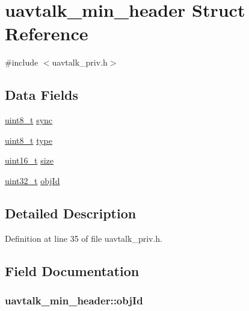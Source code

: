 \hypertarget{structuavtalk__min__header}{\section{uavtalk\-\_\-min\-\_\-header Struct Reference}
\label{structuavtalk__min__header}
}


{\ttfamily \#include $<$uavtalk\-\_\-priv.\-h$>$}

\subsection*{Data Fields}
\begin{DoxyCompactItemize}
\item 
\hyperlink{stdint_8h_aba7bc1797add20fe3efdf37ced1182c5}{uint8\-\_\-t} \hyperlink{structuavtalk__min__header_a1f264cf34649646db13e6ce6dbf93ef8}{sync}
\item 
\hyperlink{stdint_8h_aba7bc1797add20fe3efdf37ced1182c5}{uint8\-\_\-t} \hyperlink{structuavtalk__min__header_a50b5dda063861e09e6275d4cc108bcd8}{type}
\item 
\hyperlink{stdint_8h_a273cf69d639a59973b6019625df33e30}{uint16\-\_\-t} \hyperlink{structuavtalk__min__header_a7f75bcff0b29fb58f7ca4640b5be8eb6}{size}
\item 
\hyperlink{stdint_8h_a435d1572bf3f880d55459d9805097f62}{uint32\-\_\-t} \hyperlink{structuavtalk__min__header_a53f2edd4203be08998ea0fbfb09bf7cf}{obj\-Id}
\end{DoxyCompactItemize}


\subsection{Detailed Description}


Definition at line 35 of file uavtalk\-\_\-priv.\-h.



\subsection{Field Documentation}
\hypertarget{structuavtalk__min__header_a53f2edd4203be08998ea0fbfb09bf7cf}{
\subsubsection[{obj\-Id}]{ uavtalk\-\_\-min\-\_\-header\-::obj\-Id}}\label{structuavtalk__min__header_a53f2edd4203be08998ea0fbfb09bf7cf}



